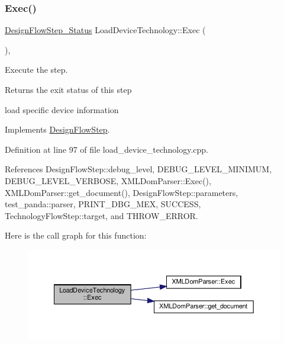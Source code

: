 \mbox{\label{classLoadDeviceTechnology_a694eac1b69f97358027d74d939d3574f}} 
\subsubsection{\texorpdfstring{Exec()}{Exec()}}
{\footnotesize\ttfamily \hyperlink{design__flow__step_8hpp_afb1f0d73069c26076b8d31dbc8ebecdf}{Design\+Flow\+Step\+\_\+\+Status} Load\+Device\+Technology\+::\+Exec (\begin{DoxyParamCaption}{ }\end{DoxyParamCaption})\hspace{0.3cm}{\ttfamily [override]}, {\ttfamily [virtual]}}



Execute the step. 

\begin{DoxyReturn}{Returns}
the exit status of this step 
\end{DoxyReturn}
load specific device information 

Implements \hyperlink{classDesignFlowStep_a77d7e38493016766098711ea24f60b89}{Design\+Flow\+Step}.



Definition at line 97 of file load\+\_\+device\+\_\+technology.\+cpp.



References Design\+Flow\+Step\+::debug\+\_\+level, D\+E\+B\+U\+G\+\_\+\+L\+E\+V\+E\+L\+\_\+\+M\+I\+N\+I\+M\+UM, D\+E\+B\+U\+G\+\_\+\+L\+E\+V\+E\+L\+\_\+\+V\+E\+R\+B\+O\+SE, X\+M\+L\+Dom\+Parser\+::\+Exec(), X\+M\+L\+Dom\+Parser\+::get\+\_\+document(), Design\+Flow\+Step\+::parameters, test\+\_\+panda\+::parser, P\+R\+I\+N\+T\+\_\+\+D\+B\+G\+\_\+\+M\+EX, S\+U\+C\+C\+E\+SS, Technology\+Flow\+Step\+::target, and T\+H\+R\+O\+W\+\_\+\+E\+R\+R\+OR.

Here is the call graph for this function\+:
\nopagebreak
\begin{figure}[H]
\begin{center}
\leavevmode
\includegraphics[width=350pt]{d3/d84/classLoadDeviceTechnology_a694eac1b69f97358027d74d939d3574f_cgraph}
\end{center}
\end{figure}


